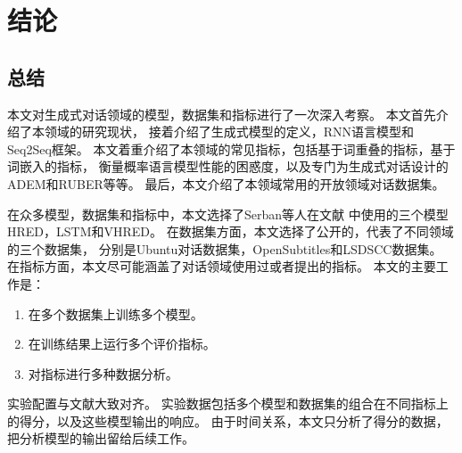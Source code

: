 % 
% 
% 
% 

\chapter*{结论}\label{ch:conclusion}

\section*{总结}\label{sec:conclusion}
本文对生成式对话领域的模型，数据集和指标进行了一次深入考察。
本文首先介绍了本领域的研究现状，
接着介绍了生成式模型的定义，RNN语言模型和Seq2Seq框架。
本文着重介绍了本领域的常见指标，包括基于词重叠的指标，基于词嵌入的指标，
衡量概率语言模型性能的困惑度，以及专门为生成式对话设计的ADEM和RUBER等等。
最后，本文介绍了本领域常用的开放领域对话数据集。

在众多模型，数据集和指标中，本文选择了Serban等人在文献\cite{VHRED}
中使用的三个模型HRED，LSTM和VHRED。
在数据集方面，本文选择了公开的，代表了不同领域的三个数据集，
分别是Ubuntu对话数据集，OpenSubtitles和LSDSCC数据集。
在指标方面，本文尽可能涵盖了对话领域使用过或者提出的指标。
本文的主要工作是：
\begin{enumerate}
    \item 在多个数据集上训练多个模型。
    \item 在训练结果上运行多个评价指标。
    \item 对指标进行多种数据分析。
\end{enumerate}
实验配置与文献\cite{HowNot}大致对齐。
实验数据包括多个模型和数据集的组合在不同指标上的得分，以及这些模型输出的响应。
由于时间关系，本文只分析了得分的数据，把分析模型的输出留给后续工作。


